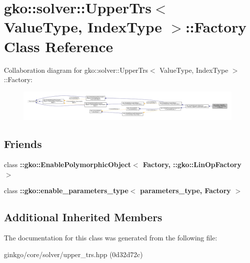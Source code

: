 \hypertarget{classgko_1_1solver_1_1UpperTrs_1_1Factory}{}\section{gko\+:\+:solver\+:\+:Upper\+Trs$<$ Value\+Type, Index\+Type $>$\+:\+:Factory Class Reference}
\label{classgko_1_1solver_1_1UpperTrs_1_1Factory}


Collaboration diagram for gko\+:\+:solver\+:\+:Upper\+Trs$<$ Value\+Type, Index\+Type $>$\+:\+:Factory\+:
\nopagebreak
\begin{figure}[H]
\begin{center}
\leavevmode
\includegraphics[width=350pt]{classgko_1_1solver_1_1UpperTrs_1_1Factory__coll__graph}
\end{center}
\end{figure}
\subsection*{Friends}
\begin{DoxyCompactItemize}
\item 
\mbox{\label{classgko_1_1solver_1_1UpperTrs_1_1Factory_a27e9bbc94a1c1c59f40833153eda8f78}} 
class {\bfseries \+::gko\+::\+Enable\+Polymorphic\+Object$<$ Factory, \+::gko\+::\+Lin\+Op\+Factory $>$}
\item 
\mbox{\label{classgko_1_1solver_1_1UpperTrs_1_1Factory_a0d176cbd42d6214e11aee8c30ca256fc}} 
class {\bfseries \+::gko\+::enable\+\_\+parameters\+\_\+type$<$ parameters\+\_\+type, Factory $>$}
\end{DoxyCompactItemize}
\subsection*{Additional Inherited Members}


The documentation for this class was generated from the following file\+:\begin{DoxyCompactItemize}
\item 
ginkgo/core/solver/upper\+\_\+trs.\+hpp (0d32d72c)\end{DoxyCompactItemize}
